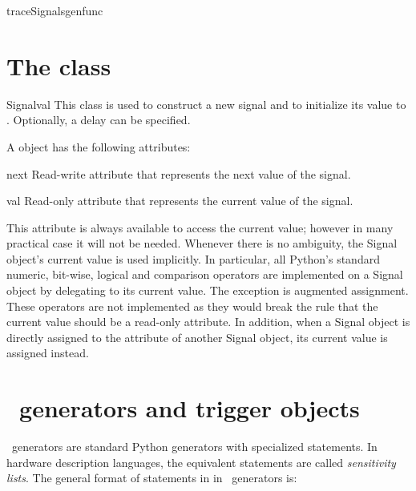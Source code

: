 \begin{funcdesc}{traceSignals}{genfunc  }

\end{funcdesc}




\section{The  class \label{ref-sig}}

\begin{classdesc}{Signal}{val }
This class is used to construct a new signal and to initialize its
value to . Optionally, a delay can be specified.
\end{classdesc}

A  object has the following attributes:

\begin{memberdesc}[Signal]{next}
Read-write attribute that represents the next value of the signal.
\end{memberdesc}

\begin{memberdesc}[Signal]{val}
Read-only attribute that represents the current value of the signal.

This attribute is always available to access the current value;
however in many practical case it will not be needed. Whenever there
is no ambiguity, the Signal object's current value is used
implicitly. In particular, all Python's standard numeric, bit-wise,
logical and comparison operators are implemented on a Signal object by
delegating to its current value. The exception is augmented
assignment. These operators are not implemented as they would break
the rule that the current value should be a read-only attribute. In
addition, when a Signal object is directly assigned to the 
attribute of another Signal object, its current value is assigned
instead.
\end{memberdesc}



\section{\myhdl\ generators and trigger objects \label{ref-gen}}

\myhdl\ generators are standard Python generators with specialized
 statements. In hardware description languages, the equivalent
statements are called \emph{sensitivity lists}. The general format
of  statements in in \myhdl\ generators is:

